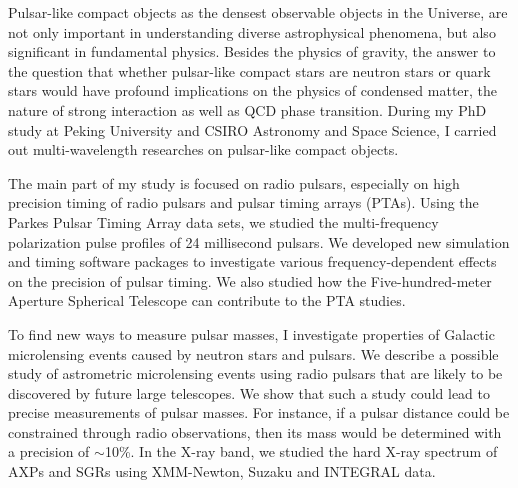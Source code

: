 \begin{eabstract}

Pulsar-like compact objects as the densest observable objects in the Universe, are not only
important in understanding diverse astrophysical phenomena, but also significant in fundamental
physics. Besides the physics of gravity, the answer to the question that whether pulsar-like
compact stars are neutron stars or quark stars would have profound implications on the physics
of condensed matter, the nature of strong interaction as well as QCD phase transition. During 
my PhD study at Peking University and CSIRO Astronomy and Space Science, I carried out multi-wavelength 
researches on pulsar-like compact objects. 

The main part of my study is focused on radio pulsars, especially on high precision timing of 
radio pulsars and pulsar timing arrays (PTAs). Using the Parkes Pulsar Timing Array data 
sets, we studied the multi-frequency polarization pulse profiles of 24 millisecond pulsars. We
developed new simulation and timing software packages to investigate various frequency-dependent 
effects on the precision of pulsar timing. We also studied how the Five-hundred-meter Aperture 
Spherical Telescope can contribute to the PTA studies. 

To find new ways to measure pulsar masses, I investigate properties of Galactic microlensing 
events caused by neutron stars and pulsars. We describe a possible study of astrometric microlensing 
events using radio pulsars that are likely to be discovered by future large telescopes. We show 
that such a study could lead to precise measurements of pulsar masses. For instance, if a pulsar 
distance could be constrained through radio observations, then its mass would be determined with 
a precision of $\sim$10\%. In the X-ray band, we studied the hard X-ray spectrum of AXPs and SGRs 
using XMM-Newton, Suzaku and INTEGRAL data. 

\end{eabstract}

